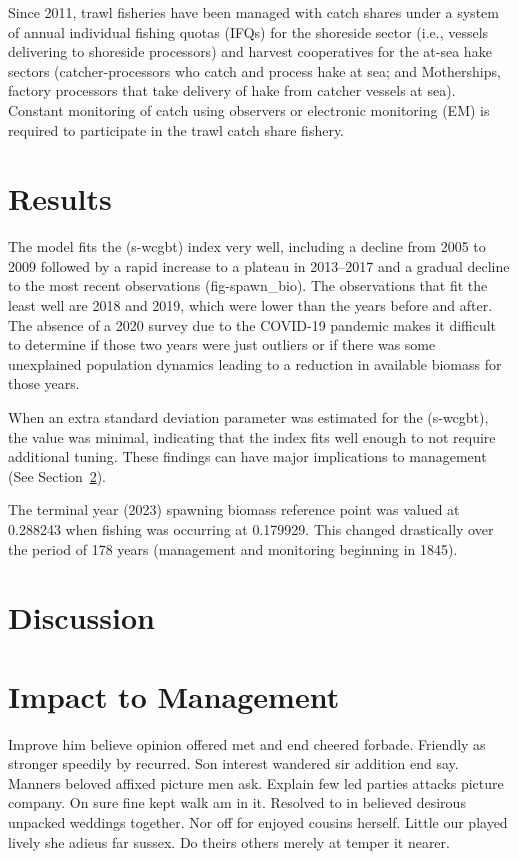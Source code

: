 \documentclass[
]{scrartcl}
\begin{document}
Since 2011, trawl fisheries have been managed with catch shares under a
system of annual individual fishing quotas (IFQs) for the shoreside
sector (i.e., vessels delivering to shoreside processors) and harvest
cooperatives for the at-sea hake sectors (catcher-processors who catch
and process hake at sea; and Motherships, factory processors that take
delivery of hake from catcher vessels at sea). Constant monitoring of
catch using observers or electronic monitoring (EM) is required to
participate in the trawl catch share fishery.

\section{Results}\label{sec-results}

The model fits the (s-wcgbt) index very well, including a decline from
2005 to 2009 followed by a rapid increase to a plateau in 2013--2017 and
a gradual decline to the most recent observations (fig-spawn\_bio). The
observations that fit the least well are 2018 and 2019, which were lower
than the years before and after. The absence of a 2020 survey due to the
COVID-19 pandemic makes it difficult to determine if those two years
were just outliers or if there was some unexplained population dynamics
leading to a reduction in available biomass for those years.

When an extra standard deviation parameter was estimated for the
(s-wcgbt), the value was minimal, indicating that the index fits well
enough to not require additional tuning. These findings can have major
implications to management (See Section~\ref{sec-discussion}).

The terminal year (2023) spawning biomass reference point was valued at
0.288243 when fishing was occurring at 0.179929. This changed
drastically over the period of 178 years (management and monitoring
beginning in 1845).

\section{Discussion}\label{sec-discussion}

\section{Impact to Management}\label{sec-impact}

Improve him believe opinion offered met and end cheered forbade.
Friendly as stronger speedily by recurred. Son interest wandered sir
addition end say. Manners beloved affixed picture men ask. Explain few
led parties attacks picture company. On sure fine kept walk am in it.
Resolved to in believed desirous unpacked weddings together. Nor off for
enjoyed cousins herself. Little our played lively she adieus far sussex.
Do theirs others merely at temper it nearer.
\end{document}
